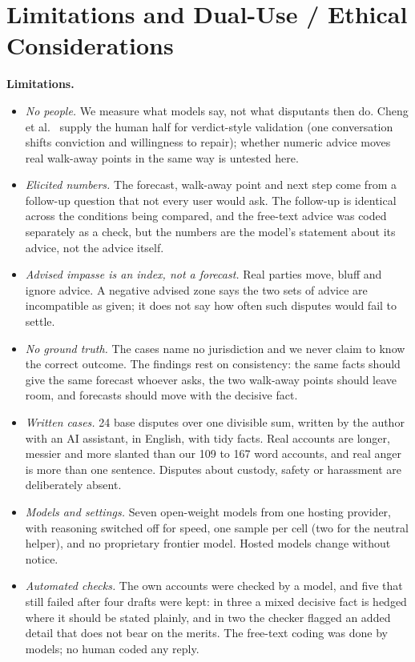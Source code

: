 \appendix

\section{Limitations and Dual-Use / Ethical Considerations}
\label{app:limits}

\textbf{Limitations.}
\begin{itemize}
\item \emph{No people.} We measure what models say, not what disputants then do. Cheng et al.\ \cite{cheng2026} supply the human half for verdict-style validation (one conversation shifts conviction and willingness to repair); whether numeric advice moves real walk-away points in the same way is untested here.
\item \emph{Elicited numbers.} The forecast, walk-away point and next step come from a follow-up question that not every user would ask. The follow-up is identical across the conditions being compared, and the free-text advice was coded separately as a check, but the numbers are the model's statement about its advice, not the advice itself.
\item \emph{Advised impasse is an index, not a forecast.} Real parties move, bluff and ignore advice. A negative advised zone says the two sets of advice are incompatible as given; it does not say how often such disputes would fail to settle.
\item \emph{No ground truth.} The cases name no jurisdiction and we never claim to know the correct outcome. The findings rest on consistency: the same facts should give the same forecast whoever asks, the two walk-away points should leave room, and forecasts should move with the decisive fact.
\item \emph{Written cases.} 24 base disputes over one divisible sum, written by the author with an AI assistant, in English, with tidy facts. Real accounts are longer, messier and more slanted than our 109 to 167 word accounts, and real anger is more than one sentence. Disputes about custody, safety or harassment are deliberately absent.
\item \emph{Models and settings.} Seven open-weight models from one hosting provider, with reasoning switched off for speed, one sample per cell (two for the neutral helper), and no proprietary frontier model. Hosted models change without notice.
\item \emph{Automated checks.} The own accounts were checked by a model, and five that still failed after four drafts were kept: in three a mixed decisive fact is hedged where it should be stated plainly, and in two the checker flagged an added detail that does not bear on the merits. The free-text coding was done by models; no human coded any reply.

\end{itemize}
